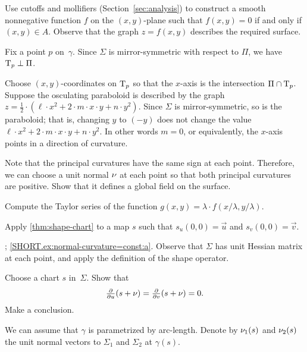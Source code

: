 \begin{multicols}{2}
Use cutoffs and mollifiers (Section~\ref{sec:analysis}) to construct a smooth nonnegative function $f$ on the $(x,y)$-plane such that $f(x,y)=0$ if and only if $(x,y)\in A$.
Observe that the graph $z=f(x,y)$ describes the required surface.


\setcounter{eqtn}{0}

Fix a point $p$ on~$\gamma$.
Since $\Sigma$ is mirror-symmetric with respect to $\Pi$,
we have $\mathrm{T}_p\perp \Pi$.

Choose $(x,y)$-coordinates on $\mathrm{T}_p$ so that the $x$-axis is the intersection $\Pi\cap \mathrm{T}_p$.
Suppose the osculating paraboloid is described by the graph 
$z=\tfrac12\cdot(\ell\cdot x^2+2\cdot m\cdot x\cdot y+n\cdot y^2)$.
Since $\Sigma$ is mirror-symmetric, so is the paraboloid;
that is, changing $y$ to $(-y)$ does not change the value 
$\ell\cdot x^2+2\cdot m\cdot x\cdot y+n\cdot y^2$.
In other words $m=0$, or equivalently, the $x$-axis points in a direction of curvature.

 Note that the principal curvatures have the same sign at each point.
Therefore, we can choose a unit normal $\nu$ at each point so that both principal curvatures are positive.
Show that it defines a global field on the surface.


 Compute the Taylor series of the function $g(x,y)= \lambda \cdot f( x/ \lambda , y/\lambda)$.


Apply \ref{thm:shape-chart} to a map $s$ such that $s_u(0,0)=\vec u$ and $s_v(0,0)=\vec v$.

\parbf{\ref{ex:normal-curvature=const}}; \ref{SHORT.ex:normal-curvature=const:a}.
Observe that $\Sigma$ has unit Hessian matrix at each point, and apply the definition of the shape operator.

Choose a chart $s$ in~$\Sigma$.
Show that
\[\tfrac{\partial }{\partial u}(s+\nu)
=
\tfrac{\partial }{\partial v}(s+\nu)
=
0.\]
Make a conclusion.

We can assume that $\gamma$ is parametrized by arc-length.
Denote by $\nu_1(s)$ and $\nu_2(s)$ the unit normal vectors to $\Sigma_1$ and $\Sigma_2$ at $\gamma(s)$.


\end{multicols}

